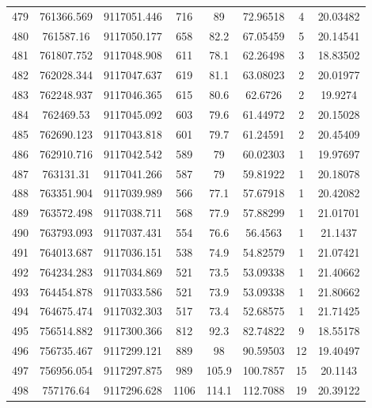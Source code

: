 \begin{longtable}{cccccccc}
479  & 761366.569      & 9117051.446      & 716     & 89    & 72.96518 & 4  & 20.03482 \\
480  & 761587.16       & 9117050.177      & 658     & 82.2  & 67.05459 & 5  & 20.14541 \\
481  & 761807.752      & 9117048.908      & 611     & 78.1  & 62.26498 & 3  & 18.83502 \\
482  & 762028.344      & 9117047.637      & 619     & 81.1  & 63.08023 & 2  & 20.01977 \\
483  & 762248.937      & 9117046.365      & 615     & 80.6  & 62.6726  & 2  & 19.9274  \\
484  & 762469.53       & 9117045.092      & 603     & 79.6  & 61.44972 & 2  & 20.15028 \\
485  & 762690.123      & 9117043.818      & 601     & 79.7  & 61.24591 & 2  & 20.45409 \\
486  & 762910.716      & 9117042.542      & 589     & 79    & 60.02303 & 1  & 19.97697 \\
487  & 763131.31       & 9117041.266      & 587     & 79    & 59.81922 & 1  & 20.18078 \\
488  & 763351.904      & 9117039.989      & 566     & 77.1  & 57.67918 & 1  & 20.42082 \\
489  & 763572.498      & 9117038.711      & 568     & 77.9  & 57.88299 & 1  & 21.01701 \\
490  & 763793.093      & 9117037.431      & 554     & 76.6  & 56.4563  & 1  & 21.1437  \\
491  & 764013.687      & 9117036.151      & 538     & 74.9  & 54.82579 & 1  & 21.07421 \\
492  & 764234.283      & 9117034.869      & 521     & 73.5  & 53.09338 & 1  & 21.40662 \\
493  & 764454.878      & 9117033.586      & 521     & 73.9  & 53.09338 & 1  & 21.80662 \\
494  & 764675.474      & 9117032.303      & 517     & 73.4  & 52.68575 & 1  & 21.71425 \\
495  & 756514.882      & 9117300.366      & 812     & 92.3  & 82.74822 & 9  & 18.55178 \\
496  & 756735.467      & 9117299.121      & 889     & 98    & 90.59503 & 12 & 19.40497 \\
497  & 756956.054      & 9117297.875      & 989     & 105.9 & 100.7857 & 15 & 20.1143  \\
498  & 757176.64       & 9117296.628      & 1106    & 114.1 & 112.7088 & 19 & 20.39122 \\

\end{longtable}
